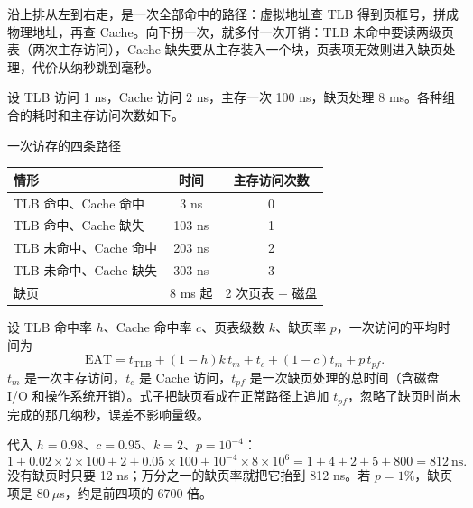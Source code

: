 沿上排从左到右走，是一次全部命中的路径：虚拟地址查 TLB 得到页框号，拼成物理地址，再查 Cache。向下拐一次，就多付一次开销：TLB 未命中要读两级页表（两次主存访问），Cache 缺失要从主存装入一个块，页表项无效则进入缺页处理，代价从纳秒跳到毫秒。

设 TLB 访问 1 ns，Cache 访问 2 ns，主存一次 100 ns，缺页处理 8 ms。各种组合的耗时和主存访问次数如下。

\begin{tablebox}{一次访存的四条路径}
\centering
\small
\begin{tabular}{|l|c|c|}
\hline
情形 & 时间 & 主存访问次数 \\
\hline
TLB 命中、Cache 命中 & 3 ns & 0 \\
TLB 命中、Cache 缺失 & 103 ns & 1 \\
TLB 未命中、Cache 命中 & 203 ns & 2 \\
TLB 未命中、Cache 缺失 & 303 ns & 3 \\
缺页 & 8 ms 起 & 2 次页表 $+$ 磁盘 \\
\hline
\end{tabular}
\end{tablebox}

设 TLB 命中率 $h$、Cache 命中率 $c$、页表级数 $k$、缺页率 $p$，一次访问的平均时间为
\[
\mathrm{EAT}=t_{\mathrm{TLB}}+(1-h)k\,t_m+t_c+(1-c)t_m+p\,t_{pf}.
\]
$t_m$ 是一次主存访问，$t_c$ 是 Cache 访问，$t_{pf}$ 是一次缺页处理的总时间（含磁盘 I/O 和操作系统开销）。式子把缺页看成在正常路径上追加 $t_{pf}$，忽略了缺页时尚未完成的那几纳秒，误差不影响量级。

代入 $h=0.98$、$c=0.95$、$k=2$、$p=10^{-4}$：
\[
1+0.02\times2\times100+2+0.05\times100+10^{-4}\times8\times10^{6}
=1+4+2+5+800=812\ \text{ns}.
\]
没有缺页时只要 12 ns；万分之一的缺页率就把它抬到 812 ns。若 $p=1\%$，缺页项是 $80\ \mu$s，约是前四项的 6700 倍。

\begin{center}
\end{center}

